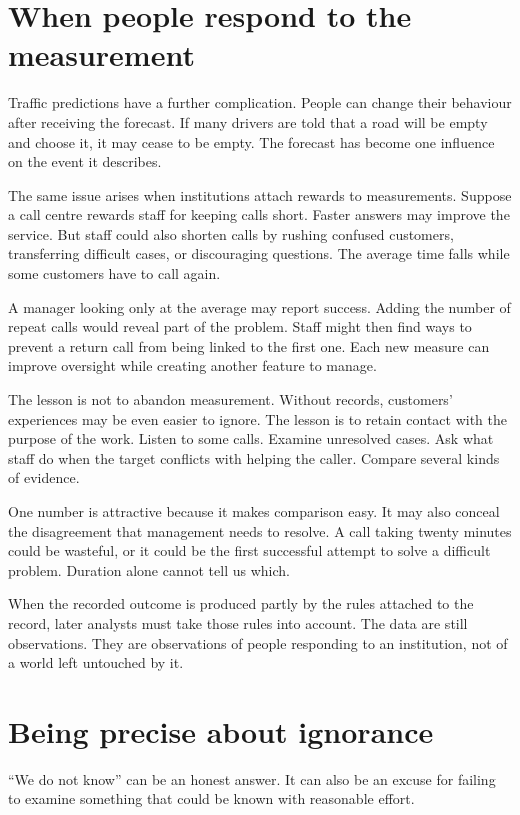 \documentclass[12pt,a4paper]{book}
\begin{document}
\section*{When people respond to the measurement}

Traffic predictions have a further complication. People can change their behaviour after receiving the forecast. If many drivers are told that a road will be empty and choose it, it may cease to be empty. The forecast has become one influence on the event it describes.

The same issue arises when institutions attach rewards to measurements. Suppose a call centre rewards staff for keeping calls short. Faster answers may improve the service. But staff could also shorten calls by rushing confused customers, transferring difficult cases, or discouraging questions. The average time falls while some customers have to call again.

A manager looking only at the average may report success. Adding the number of repeat calls would reveal part of the problem. Staff might then find ways to prevent a return call from being linked to the first one. Each new measure can improve oversight while creating another feature to manage.

The lesson is not to abandon measurement. Without records, customers' experiences may be even easier to ignore. The lesson is to retain contact with the purpose of the work. Listen to some calls. Examine unresolved cases. Ask what staff do when the target conflicts with helping the caller. Compare several kinds of evidence.

One number is attractive because it makes comparison easy. It may also conceal the disagreement that management needs to resolve. A call taking twenty minutes could be wasteful, or it could be the first successful attempt to solve a difficult problem. Duration alone cannot tell us which.

When the recorded outcome is produced partly by the rules attached to the record, later analysts must take those rules into account. The data are still observations. They are observations of people responding to an institution, not of a world left untouched by it.

\section*{Being precise about ignorance}

``We do not know'' can be an honest answer. It can also be an excuse for failing to examine something that could be known with reasonable effort.
\end{document}
